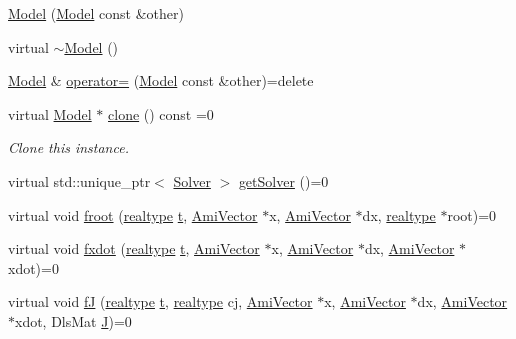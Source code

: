 \begin{DoxyCompactItemize}
\item 
\mbox{\hyperlink{classamici_1_1_model_ac14ff03be3aca4544930007fafdfd3f1}{Model}} (\mbox{\hyperlink{classamici_1_1_model}{Model}} const \&other)
\item 
virtual \mbox{\hyperlink{classamici_1_1_model_a252c349b237f7779edf32778eb541a99}{$\sim$\+Model}} ()
\item 
\mbox{\hyperlink{classamici_1_1_model}{Model}} \& \mbox{\hyperlink{classamici_1_1_model_abcf360cf2836a5c7a7686a6a5c0c6bfa}{operator=}} (\mbox{\hyperlink{classamici_1_1_model}{Model}} const \&other)=delete
\item 
virtual \mbox{\hyperlink{classamici_1_1_model}{Model}} $\ast$ \mbox{\hyperlink{classamici_1_1_model_a109f753bb5889d6563476826f5a3666d}{clone}} () const =0
\begin{DoxyCompactList}\small\item\em Clone this instance. \end{DoxyCompactList}\item 
virtual std\+::unique\+\_\+ptr$<$ \mbox{\hyperlink{classamici_1_1_solver}{Solver}} $>$ \mbox{\hyperlink{classamici_1_1_model_a61d5b19b2e4d5ffcc73a014d59494344}{get\+Solver}} ()=0
\item 
virtual void \mbox{\hyperlink{classamici_1_1_model_a9124751917d81611cc237c853d9cf6b6}{froot}} (\mbox{\hyperlink{namespaceamici_a1bdce28051d6a53868f7ccbf5f2c14a3}{realtype}} \mbox{\hyperlink{classamici_1_1_model_a711281d57e9710226face29151cc4641}{t}}, \mbox{\hyperlink{classamici_1_1_ami_vector}{Ami\+Vector}} $\ast$x, \mbox{\hyperlink{classamici_1_1_ami_vector}{Ami\+Vector}} $\ast$dx, \mbox{\hyperlink{namespaceamici_a1bdce28051d6a53868f7ccbf5f2c14a3}{realtype}} $\ast$root)=0
\item 
virtual void \mbox{\hyperlink{classamici_1_1_model_a30b9be6c722585f984c9406d8831703e}{fxdot}} (\mbox{\hyperlink{namespaceamici_a1bdce28051d6a53868f7ccbf5f2c14a3}{realtype}} \mbox{\hyperlink{classamici_1_1_model_a711281d57e9710226face29151cc4641}{t}}, \mbox{\hyperlink{classamici_1_1_ami_vector}{Ami\+Vector}} $\ast$x, \mbox{\hyperlink{classamici_1_1_ami_vector}{Ami\+Vector}} $\ast$dx, \mbox{\hyperlink{classamici_1_1_ami_vector}{Ami\+Vector}} $\ast$xdot)=0
\item 
virtual void \mbox{\hyperlink{classamici_1_1_model_a7df960e9bdb8245155e53e5fbb6d2c6a}{fJ}} (\mbox{\hyperlink{namespaceamici_a1bdce28051d6a53868f7ccbf5f2c14a3}{realtype}} \mbox{\hyperlink{classamici_1_1_model_a711281d57e9710226face29151cc4641}{t}}, \mbox{\hyperlink{namespaceamici_a1bdce28051d6a53868f7ccbf5f2c14a3}{realtype}} cj, \mbox{\hyperlink{classamici_1_1_ami_vector}{Ami\+Vector}} $\ast$x, \mbox{\hyperlink{classamici_1_1_ami_vector}{Ami\+Vector}} $\ast$dx, \mbox{\hyperlink{classamici_1_1_ami_vector}{Ami\+Vector}} $\ast$xdot, Dls\+Mat \mbox{\hyperlink{classamici_1_1_model_a71cc1d93543998249a172328e1a4dbcd}{J}})=0

\end{DoxyCompactItemize}

